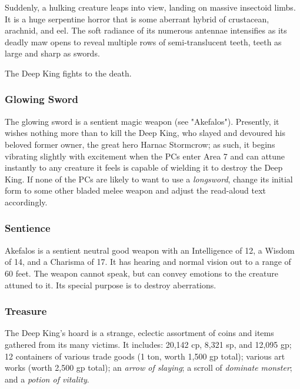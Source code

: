 \documentclass[10pt,a4paper,twoside,bg=print,twocolumn,openany,nodeprecatedcode]{dndbook}
\begin{document}
\begin{DndReadAloud}{}
Suddenly, a hulking creature leaps into view, landing on massive insectoid limbs. It is a huge serpentine horror that is some aberrant hybrid of crustacean, arachnid, and eel. The soft radiance of its numerous antennae intensifies as its deadly maw opens to reveal multiple rows of semi-translucent teeth, teeth as large and sharp as swords.

\end{DndReadAloud}

The Deep King fights to the death.

\subsubsection{Glowing Sword}
The glowing sword is a sentient magic weapon (see "Akefalos"). Presently, it wishes nothing more than to kill the Deep King, who slayed and devoured his beloved former owner, the great hero Harnac Stormcrow; as such, it begins vibrating slightly with excitement when the PCs enter Area 7 and can attune instantly to any creature it feels is capable of wielding it to destroy the Deep King. If none of the PCs are likely to want to use a \textit{longsword}, change its initial form to some other bladed melee weapon and adjust the read-aloud text accordingly.

\subsubsection{Sentience}
Akefalos is a sentient neutral good weapon with an Intelligence of 12, a Wisdom of 14, and a Charisma of 17. It has hearing and normal vision out to a range of 60 feet. The weapon cannot speak, but can convey emotions to the creature attuned to it. Its special purpose is to destroy aberrations.

\subsubsection{Treasure}
The Deep King's hoard is a strange, eclectic assortment of coins and items gathered from its many victims. It includes: 20,142 cp, 8,321 sp, and 12,095 gp; 12 containers of various trade goods (1 ton, worth 1,500 gp total); various art works (worth 2,500 gp total); an \textit{arrow of slaying}; a scroll of \textit{dominate monster}; and a \textit{potion of vitality}.
\end{document}
